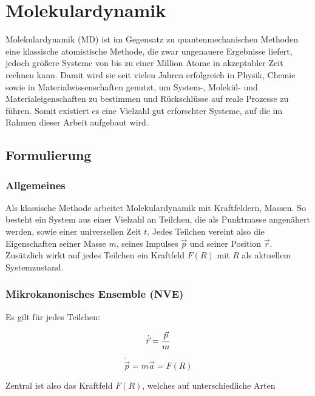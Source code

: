 \section{Molekulardynamik}
\label{md}

Molekulardynamik (MD) ist im Gegensatz zu quantenmechanischen Methoden eine klassische atomistische Methode, die zwar ungenauere Ergebnisse liefert, jedoch größere Systeme von bis zu einer Million Atome in akzeptabler Zeit rechnen kann.
Damit wird sie seit vielen Jahren erfolgreich in Physik, Chemie sowie in Materialwissenschaften genutzt, um System-, Molekül- und Materialeigenschaften zu bestimmen und Rückschlüsse auf reale Prozesse zu führen.
Somit existiert es eine Vielzahl gut erforschter Systeme, auf die im Rahmen dieser Arbeit aufgebaut wird.

\subsection{Formulierung}

\subsubsection{Allgemeines}

Als klassische Methode arbeitet Molekulardynamik mit Kraftfeldern, Massen.
So besteht ein System aus einer Vielzahl an Teilchen, die als Punktmasse angenähert werden, sowie einer universellen Zeit $t$.
Jedes Teilchen vereint also die Eigenschaften seiner Masse $m$, seines Impulses $\vec p$ und seiner Position $\vec r$.
Zusätzlich wirkt auf jedes Teilchen ein Kraftfeld $F(R)$ mit $R$ als aktuellem Systemzustand.

\subsubsection{Mikrokanonisches Ensemble (NVE)}

Es gilt für jedes Teilchen:

\begin{equation}
  \dot{\vec r} = {\vec p \over m}
\end{equation}

\begin{equation}
  \dot{\vec p} = m \vec a = F(R)
\end{equation}


Zentral ist also das Kraftfeld $F(R)$, welches auf unterschiedliche Arten

